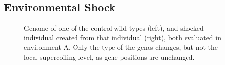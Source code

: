 \subsection{Environmental Shock}

\begin{figure}
  \centering
  \begin{elasticrow}[width=\textwidth]
  \end{elasticrow}
  \caption[Evolved individual and shocked individual]{Genome of one of the control wild-types (left), and shocked individual created from that individual (right), both evaluated in environment A.
  Only the type of the genes changes, but not the local supercoiling level, as gene positions are unchanged.}
  \label{fig:epistasis:genomes}
\end{figure}
